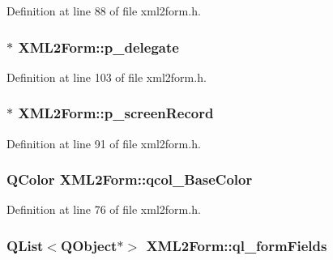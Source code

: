 Definition at line 88 of file xml2form.h.

\hypertarget{classXML2Form_aa69423c0c79ac964cb295be17856bb85}{
\subsubsection[{p\_\-delegate}]{$\ast$ {\bf XML2Form::p\_\-delegate}}}
\label{classXML2Form_aa69423c0c79ac964cb295be17856bb85}


Definition at line 103 of file xml2form.h.

\hypertarget{classXML2Form_a03f67ad20c8828f5864659ce6740bcb7}{
\subsubsection[{p\_\-screenRecord}]{$\ast$ {\bf XML2Form::p\_\-screenRecord}}}
\label{classXML2Form_a03f67ad20c8828f5864659ce6740bcb7}


Definition at line 91 of file xml2form.h.

\hypertarget{classXML2Form_aaf96ae45cb0c2c4c58e9e6d86385c0c4}{
\subsubsection[{qcol\_\-BaseColor}]{\setlength{\rightskip}{0pt plus 5cm}QColor {\bf XML2Form::qcol\_\-BaseColor}}}
\label{classXML2Form_aaf96ae45cb0c2c4c58e9e6d86385c0c4}


Definition at line 76 of file xml2form.h.

\hypertarget{classXML2Form_a4b16916a87a4c7d23e5708d47c211777}{
\subsubsection[{ql\_\-formFields}]{\setlength{\rightskip}{0pt plus 5cm}QList$<$QObject$\ast$$>$ {\bf XML2Form::ql\_\-formFields}}}
\label{classXML2Form_a4b16916a87a4c7d23e5708d47c211777}


